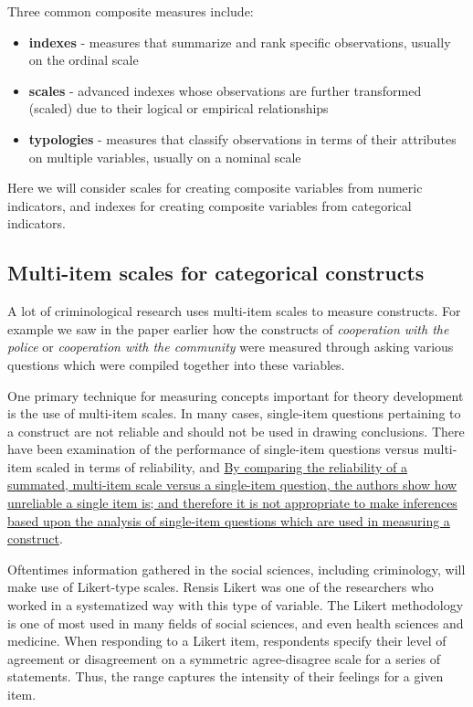 \documentclass[]{book}
\providecommand{\tightlist}{%
  \setlength{\itemsep}{0pt}\setlength{\parskip}{0pt}}
\theoremstyle{definition}
\theoremstyle{definition}
\theoremstyle{definition}
\theoremstyle{remark}
\begin{document}
Three common composite measures include:

\begin{itemize}
\tightlist
\item
  \textbf{indexes} - measures that summarize and rank specific
  observations, usually on the ordinal scale
\item
  \textbf{scales} - advanced indexes whose observations are further
  transformed (scaled) due to their logical or empirical relationships
\item
  \textbf{typologies} - measures that classify observations in terms of
  their attributes on multiple variables, usually on a nominal scale
\end{itemize}

Here we will consider scales for creating composite variables from
numeric indicators, and indexes for creating composite variables from
categorical indicators.

\hypertarget{multi-item-scales-for-categorical-constructs}{%
\subsection{Multi-item scales for categorical
constructs}\label{multi-item-scales-for-categorical-constructs}}

A lot of criminological research uses multi-item scales to measure
constructs. For example we saw in the paper earlier how the constructs
of \emph{cooperation with the police} or \emph{cooperation with the
community} were measured through asking various questions which were
compiled together into these variables.

One primary technique for measuring concepts important for theory
development is the use of multi-item scales. In many cases, single-item
questions pertaining to a construct are not reliable and should not be
used in drawing conclusions. There have been examination of the
performance of single-item questions versus multi-item scaled in terms
of reliability, and
\href{https://scholarworks.iupui.edu/handle/1805/344}{By comparing the
reliability of a summated, multi-item scale versus a single-item
question, the authors show how unreliable a single item is; and
therefore it is not appropriate to make inferences based upon the
analysis of single-item questions which are used in measuring a
construct}.

Oftentimes information gathered in the social sciences, including
criminology, will make use of Likert-type scales. Rensis Likert was one
of the researchers who worked in a systematized way with this type of
variable. The Likert methodology is one of most used in many fields of
social sciences, and even health sciences and medicine. When responding
to a Likert item, respondents specify their level of agreement or
disagreement on a symmetric agree-disagree scale for a series of
statements. Thus, the range captures the intensity of their feelings for
a given item.
\end{document}
